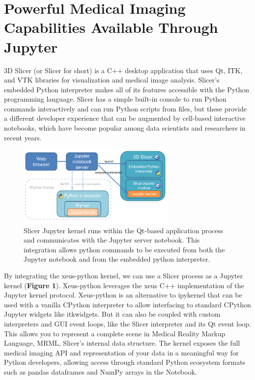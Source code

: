 \documentclass{IEEEcsmag}
\begin{document}
\section{Powerful Medical Imaging Capabilities Available Through Jupyter}

3D Slicer (or Slicer for short) is a C++ desktop application that uses Qt, ITK, and VTK libraries for visualization and medical image analysis. Slicer’s embedded Python interpreter makes all of its features accessible with the Python programming language. Slicer has a simple built-in console to run Python commands interactively and can run Python scripts from files, but these provide a different developer experience that can be augmented by  cell-based interactive notebooks, which have become popular among data scientists and researchers in recent years.

\begin{figure}
\centerline{\includegraphics[width=18.5pc]{figure1_kernel_integration.png}}
\caption{Slicer Jupyter kernel runs within the Qt-based application process and communicates with the Jupyter server notebook. This integration allows python commands to be executed from both the Jupyter notebook and from the embedded python interpreter.}
\end{figure}

By integrating the xeus-python kernel, we can use a Slicer process as a Jupyter kernel ({\bf Figure 1}). Xeus-python leverages the xeus C++ implementation of the Jupyter kernel protocol. Xeus-python is an alternative to ipykernel that can be used with a vanilla CPython interpreter to allow interfacing to standard CPython Jupyter widgets like itkwidgets. But it can also be coupled with custom interpreters and GUI event loops, like the Slicer interpreter and its Qt event loop. This allows you to represent a complete scene in Medical Reality Markup Language, MRML, Slicer’s internal data structure. The kernel exposes the full medical imaging API and representation of your data in a meaningful way for Python developers, allowing access through standard Python ecosystem formats such as pandas dataframes and NumPy arrays in the Notebook.
\end{document}
